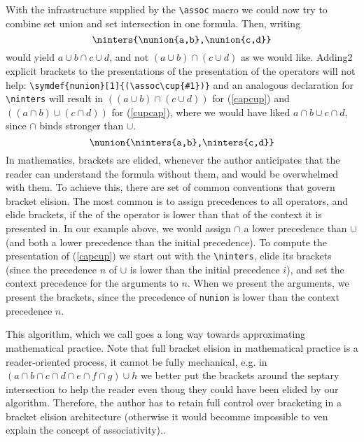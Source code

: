 With the infrastructure supplied by the \verb|\assoc| macro we could now try to combine set
union and set intersection in one formula.  Then, writing
\begin{equation}\label{capcup}
\verb|\ninters{\nunion{a,b},\nunion{c,d}}|
\end{equation}
would yield $a\cup b\cap c\cup d$, and not $(a\cup b)\cap(c\cup d)$ as we would
like. Adding2 explicit brackets to the presentations of the presentation of the operators
will not help: \verb|\symdef{nunion}[1]{(\assoc\cup{#1})}| and an analogous declaration
for \verb|\ninters| will result in $((a\cup b)\cap(c\cup d))$ for (\ref{capcup}) and
$((a\cap b)\cup(c\cap d))$ for (\ref{cupcap}), where we would have liked $a\cap b\cup
c\cap d$, since $\cap$ binds stronger than $\cup$.
\begin{equation}\label{cupcap}
\verb|\nunion{\ninters{a,b},\ninters{c,d}}|
\end{equation}
In mathematics, brackets are elided, whenever the author anticipates that the reader can
understand the formula without them, and would be overwhelmed with them. To achieve
this, there are set of common conventions that govern bracket elision. The most common
is to assign precedences to all operators, and elide brackets, if the
{} of the operator is lower than that of the context it is presented
in. In our example above, we would assign $\cap$ a lower precedence than $\cup$ (and
both a lower precedence than the initial precedence). To compute the presentation of
(\ref{capcup}) we start out with the \verb|\ninters|, elide its brackets (since the
precedence $n$ of $\cup$ is lower than the initial precedence $i$), and set the context
precedence for the arguments to $n$. When we present the arguments, we present the
brackets, since the precedence of \verb|nunion| is lower than the context precedence $n$.

This algorithm, which we call {} goes a long way
towards approximating mathematical practice. Note that full bracket elision in
mathematical practice is a reader-oriented process, it cannot be fully mechanical, e.g. in
$(a\cap b\cap c\cap d\cap e\cap f\cap g)\cup h$ we better put the brackets around the
septary intersection to help the reader even thoug they could have been elided by our
algorithm. Therefore, the author has to retain full control over bracketing in a bracket
elision architecture (otherwise it would becomme impossible to ven explain the concept of
associativity)..

